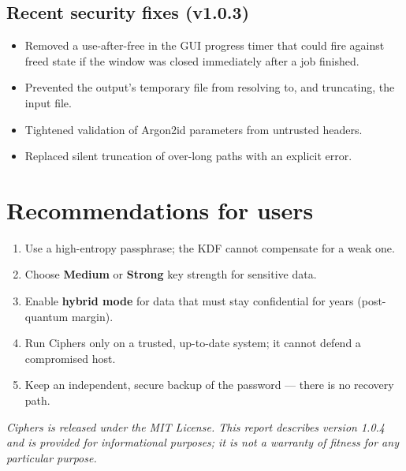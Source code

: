 \documentclass[11pt,a4paper]{article}
\begin{document}
\subsection*{Recent security fixes (v1.0.3)}
\begin{itemize}[leftmargin=1.4em]
  \item Removed a use-after-free in the GUI progress timer that could fire
        against freed state if the window was closed immediately after a job
        finished.
  \item Prevented the output's temporary file from resolving to, and
        truncating, the input file.
  \item Tightened validation of Argon2id parameters from untrusted headers.
  \item Replaced silent truncation of over-long paths with an explicit error.
\end{itemize}

\section{Recommendations for users}

\begin{enumerate}[leftmargin=1.6em]
  \item Use a high-entropy passphrase; the KDF cannot compensate for a weak
        one.
  \item Choose \textbf{Medium} or \textbf{Strong} key strength for sensitive
        data.
  \item Enable \textbf{hybrid mode} for data that must stay confidential for
        years (post-quantum margin).
  \item Run Ciphers only on a trusted, up-to-date system; it cannot defend a
        compromised host.
  \item Keep an independent, secure backup of the password — there is no
        recovery path.
\end{enumerate}

\vfill
\begin{center}
\small\textcolor{ink}{\textit{Ciphers is released under the MIT License. This
report describes version 1.0.4 and is provided for informational purposes; it
is not a warranty of fitness for any particular purpose.}}
\end{center}
\end{document}

